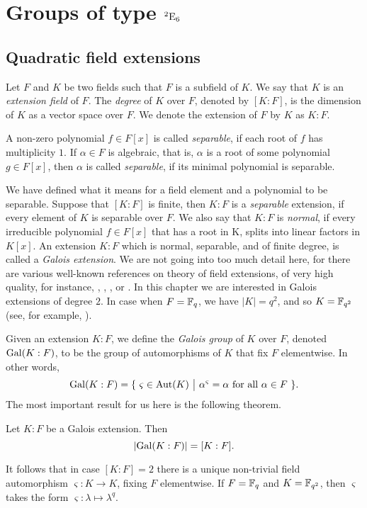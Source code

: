 \chapter{Groups of type ${}^2\mathord{\mathrm{E}}_6$}
\ifpdf
    \graphicspath{{Chapter3/Chapter3Figs/PNG/}{Chapter3/Chapter3Figs/PDF/}{Chapter3/Chapter3Figs/}}
\else
    \graphicspath{{Chapter3/Chapter3Figs/EPS/}{Chapter3/Chapter3Figs/}}
\fi

\section{Quadratic field extensions}

Let $F$ and $K$ be two fields such that $F$ is a subfield of $K$. We say that 
$K$ is an \textit{extension field} of $F$. The \textit{degree} of $K$ over $F$, 
denoted by $[K:F]$, is the dimension of $K$ as a vector space over $F$. We denote the
extension of $F$ by $K$ as $K : F$.

A non-zero polynomial $f \in F[x]$ is called \textit{separable}, if each root of $f$ has 
multiplicity $1$. If $\alpha \in F$ is algebraic, that is, $\alpha$ is a root of some polynomial
$g \in F[x]$, then $\alpha$ is called \textit{separable}, if its minimal polynomial is separable. 

We have defined what it means for a field element and a polynomial to be separable. Suppose that
$[K:F]$ is finite, then $K : F$ is a \textit{separable} extension, if every element of $K$ is 
separable over $F$. We also say that $K : F$ is \textit{normal}, if every irreducible 
polynomial $f \in F[x]$ that has a root in K, splits into linear factors in $K[x]$. An extension
$K : F$ which is normal, separable, and of finite degree, is called a \textit{Galois extension}.
We are not going into too much detail here, for there are various  well-known references on theory
of field extensions, of very high quality, for instance, \cite{PeterCameron}, \cite{DummitFoote}, \cite{Lang}, or \cite{Stewart}. In this chapter
we are interested in Galois extensions of degree $2$. 
In case when $F = \mathbb{F}_q$, we have $|K| = q^2$, and so $K = \mathbb{F}_{q^2}$ (see, for example, \cite{Moore}).

Given an extension $K : F$, we define the \textit{Galois group} of $K$ over $F$, denoted
$\mathrm{Gal}(K : F)$, to be the group
of automorphisms of $K$ that fix $F$ elementwise. In other words,
\begin{equation}
	\Gal(K : F) = \{\ \varsigma \in \Aut(K)\ \big|\ \alpha^{\varsigma} = \alpha\ \mbox{for all}\ 
		\alpha \in F\ \}.
\end{equation}
The most important result for us here is the following theorem.
\begin{theorem}
	Let $K : F$ be a Galois extension. Then
	\begin{equation}
		| \mathrm{Gal}(K : F) | = [K : F].
	\end{equation}
\end{theorem}
It follows that in case $[K:F] = 2$ there is a unique non-trivial field automorphism 
$\varsigma : K \rightarrow K$, fixing $F$ elementwise. If $F = \mathbb{F}_q$ and $K = \mathbb{F}_{q^2}$, then
$\varsigma$ takes the form $\varsigma : \lambda \mapsto \lambda^q$. 

